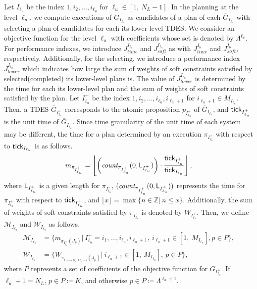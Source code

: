\documentclass{article}
\newcommand{\tick}{{\sf tick}}
\newcommand{\Len}{{\sf L}}
\newcommand{\Iu}{I_{\ell_u}}
\begin{document}
Let $\Iu$ be the index $1,i_2,\ldots,i_{\ell_u}$ for $\ell_u\in[1,~N_L-1]$.
In the planning at the level $\ell_u$, we compute executions of $G_{\Iu}$ as candidates of a plan of each $\overline{G}_{\Iu}$ with selecting a plan of candidates for each its lower-level TDES.
We consider an objective function for the level $\ell_u$ with coefficients whose set is denoted by  $\Lambda^{\ell_u}$.
For performance indexes, we introduce $J_{time}^{\Iu}$ and $J_{soft}^{\Iu}$ as with $J_{time}^{I_b}$ and $J_{soft}^{I_b}$, respectively.
Additionally, for the selecting, we introduce a performance index $J_{lower}^{\Iu}$ which indicates how large the sum of weights of soft constraints satisfied by selected(completed) its lower-level plans is.
%
The value of $J_{lower}^{\Iu}$ is determined by the time for each its lower-level plan and the sum of weights of soft constraints satisfied by the plan.
Let ${\Iu^+}$ be the index $1,i_2,\ldots,i_{\ell_u},i_{\ell_u+1}$ for $i_{\ell_u+1}\in M_{\Iu}$.
Then, a TDES $\overline{G}_{\Iu^+}$ corresponds to the atomic proposition $p_{\Iu^+}$ of $\overline{G}_{\Iu}$, and ${\tick}_{\Iu^+}$ is the unit time of $\overline{G}_{\Iu^+}$.
Since time granularity of the unit time of each system may be different, the time for a plan determined by an execution $\pi_{\Iu^+}$ with respect to $\tick_{\Iu}$ is as follows.
\begin{align}\label{ti}
m_{\pi_{\Iu^+}}=\left\lfloor \left(\textit{count}_{\pi_{\Iu^+}}(0,\Len_{{\Iu^+}})
\right)\cdot\frac{{\tick}_{\Iu^+}}{{\tick}_{\Iu}} \right\rfloor,
\end{align}
where $\Len_{{\Iu^+}}$ is a given length for $\pi_{{\Iu^+}}$, $(\textit{count}_{\pi_{{\Iu^+}}}(0,\Len_{{\Iu^+}}) )$ represents the time for $\pi_{{\Iu^+}}$ with respect to ${\tick}_{{\Iu^+}}$, and $\lfloor x \rfloor =\max\{n\in\mathbb{Z}|\ n\leq x\}$.
Additionally, the sum of weights of soft constraints satisfied by $\pi_{{\Iu^+}}$ is denoted by $W_{{\Iu^+}}$.
Then, we define $\mathcal{M}_{\Iu}$ and $\mathcal{W}_{\Iu}$ as follows.
\begin{align}
\mathcal{M}_{\Iu}&=\{m_{\pi_{\Iu^+}(J_p)}|~\Iu^+=i_1,\ldots,i_{\ell_u},i_{\ell_u+1},~i_{\ell_u+1}\in[1,~M_{\Iu}],p\in P\},\\
\mathcal{W}_{\Iu}&=\{W_{\pi_{i_1,\ldots,i_{\ell_u},i_{\ell_u+1}}(J_p)}|~i_{\ell_u+1}\in[1,~M_{\Iu}],~p\in P\},
\end{align}
where $P$ represents a set of coefficients of the objective function for $\overline{G}_{\Iu^+}$.
If ${\ell_u+1}=N_L$, $p\in P\coloneqq K$, and otherwise $p\in P\coloneqq\Lambda^{\ell_u+1}$.
\end{document}
